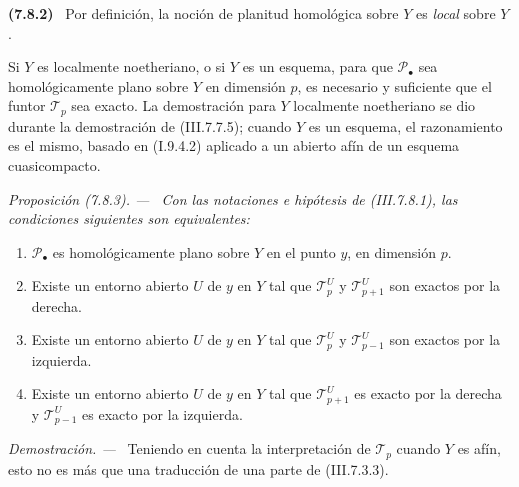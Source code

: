 \documentclass[10pt,oneside]{book}
\newcommand{\sref}[2][]{\textup{(#2)}}
\newenvironment{env}[1][]{\par\medskip\noindent\textbf{(#1)}\ }{\par}
\newenvironment{proposition}[1][]{\par\medskip\noindent\itshape Proposición (#1). ---\ }{\par}
\newenvironment{proof}{\par\medskip\noindent\textit{Demostración. ---\ }}{\par}
\begin{document}
\begin{env}[7.8.2]
\label{III.7.8.2}
Por definición, la noción de planitud homológica sobre $Y$ es
\emph{local} sobre $Y$.

Si $Y$ es localmente noetheriano, o si $Y$ es un esquema, para que
$\mathscr P_\bullet$ sea homológicamente plano sobre $Y$ en
dimensión $p$, es necesario y suficiente que el funtor
$\mathscr T_p$ sea exacto. La demostración para $Y$ localmente
noetheriano se dio durante la demostración de \sref{III.7.7.5};
cuando $Y$ es un esquema, el razonamiento es el mismo, basado en
\sref[I]{I.9.4.2} aplicado a un abierto afín de un esquema
cuasicompacto.
\end{env}

\begin{proposition}[7.8.3]
\label{III.7.8.3}
Con las notaciones e hipótesis de \textup{\sref{III.7.8.1}}, las condiciones
siguientes son equivalentes:
\begin{enumerate}
  \item[\textup{a)}] $\mathscr P_\bullet$ es homológicamente plano sobre $Y$
    en el punto $y$, en dimensión $p$.
  \item[\textup{b)}] Existe un entorno abierto $U$ de $y$ en $Y$ tal que
    $\mathscr T_p^U$ y $\mathscr T_{p+1}^U$ son exactos por la
    derecha.
  \item[\textup{c)}] Existe un entorno abierto $U$ de $y$ en $Y$ tal que
    $\mathscr T_p^U$ y $\mathscr T_{p-1}^U$ son exactos por la
    izquierda.
  \item[\textup{d)}] Existe un entorno abierto $U$ de $y$ en $Y$ tal que
    $\mathscr T_{p+1}^U$ es exacto por la derecha y
    $\mathscr T_{p-1}^U$ es exacto por la izquierda.
\end{enumerate}
\end{proposition}

\begin{proof}
Teniendo en cuenta la interpretación de $\mathscr T_p$ cuando $Y$
es afín, esto no es más que una traducción de una parte de
\sref{III.7.3.3}.
\end{proof}
\end{document}
